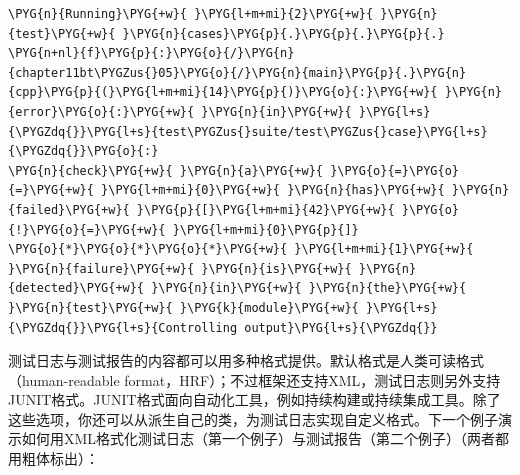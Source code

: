 \begin{codeblockbg}
\begin{Verbatim}[commandchars=\\\{\},breaklines=true,breakanywhere=true,fontsize=\codefont,xleftmargin=17bp]
\PYG{n}{Running}\PYG{+w}{ }\PYG{l+m+mi}{2}\PYG{+w}{ }\PYG{n}{test}\PYG{+w}{ }\PYG{n}{cases}\PYG{p}{.}\PYG{p}{.}\PYG{p}{.}
\PYG{n+nl}{f}\PYG{p}{:}\PYG{o}{/}\PYG{n}{chapter11bt\PYGZus{}05}\PYG{o}{/}\PYG{n}{main}\PYG{p}{.}\PYG{n}{cpp}\PYG{p}{(}\PYG{l+m+mi}{14}\PYG{p}{)}\PYG{o}{:}\PYG{+w}{ }\PYG{n}{error}\PYG{o}{:}\PYG{+w}{ }\PYG{n}{in}\PYG{+w}{ }\PYG{l+s}{\PYGZdq{}}\PYG{l+s}{test\PYGZus{}suite/test\PYGZus{}case}\PYG{l+s}{\PYGZdq{}}\PYG{o}{:}
\PYG{n}{check}\PYG{+w}{ }\PYG{n}{a}\PYG{+w}{ }\PYG{o}{=}\PYG{o}{=}\PYG{+w}{ }\PYG{l+m+mi}{0}\PYG{+w}{ }\PYG{n}{has}\PYG{+w}{ }\PYG{n}{failed}\PYG{+w}{ }\PYG{p}{[}\PYG{l+m+mi}{42}\PYG{+w}{ }\PYG{o}{!}\PYG{o}{=}\PYG{+w}{ }\PYG{l+m+mi}{0}\PYG{p}{]}
\PYG{o}{*}\PYG{o}{*}\PYG{o}{*}\PYG{+w}{ }\PYG{l+m+mi}{1}\PYG{+w}{ }\PYG{n}{failure}\PYG{+w}{ }\PYG{n}{is}\PYG{+w}{ }\PYG{n}{detected}\PYG{+w}{ }\PYG{n}{in}\PYG{+w}{ }\PYG{n}{the}\PYG{+w}{ }\PYG{n}{test}\PYG{+w}{ }\PYG{k}{module}\PYG{+w}{ }\PYG{l+s}{\PYGZdq{}}\PYG{l+s}{Controlling output}\PYG{l+s}{\PYGZdq{}}
\end{Verbatim}
\end{codeblockbg}



测试日志与测试报告的内容都可以用多种格式提供。默认格式是人类可读格式（human-readable format，HRF）；不过框架还支持XML，测试日志则另外支持JUNIT格式。JUNIT格式面向自动化工具，例如持续构建或持续集成工具。除了这些选项，你还可以从派生自己的类，为测试日志实现自定义格式。下一个例子演示如何用XML格式化测试日志（第一个例子）与测试报告（第二个例子）（两者都用粗体标出）：



